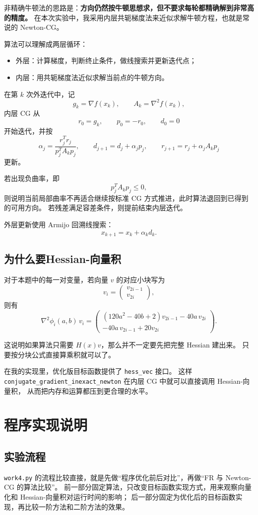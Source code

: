 \documentclass[12pt,a4paper]{ctexart}
\begin{document}
非精确牛顿法的思路是：\textbf{方向仍然按牛顿思想求，但不要求每轮都精确解到非常高的精度。}
在本次实验中，我采用内层共轭梯度法来近似求解牛顿方程，也就是常说的 Newton-CG。

算法可以理解成两层循环：
\begin{itemize}
  \item 外层：计算梯度，判断终止条件，做线搜索并更新迭代点；
  \item 内层：用共轭梯度法近似求解当前点的牛顿方向。
\end{itemize}

在第 \(k\) 次外迭代中，记
\[
g_k=\nabla f(x_k), \qquad A_k=\nabla^2 f(x_k),
\]
内层 CG 从
\[
r_0=g_k,\qquad p_0=-r_0,\qquad d_0=0
\]
开始迭代，并按
\[
\alpha_j=\frac{r_j^T r_j}{p_j^T A_k p_j}, \qquad
d_{j+1}=d_j+\alpha_j p_j, \qquad
r_{j+1}=r_j+\alpha_j A_k p_j
\]
更新。

若出现负曲率，即
\[
p_j^T A_k p_j \le 0,
\]
则说明当前局部曲率不再适合继续按标准 CG 方式推进，此时算法退回到已得到的可用方向。
若残差满足容差条件，则提前结束内层迭代。

外层更新使用 Armijo 回溯线搜索：
\[
x_{k+1}=x_k+\alpha_k d_k.
\]



\subsection{为什么要Hessian-向量积}
对于本题中的每一对变量，若向量 \(v\) 的对应小块写为
\[
v_i=
\begin{pmatrix}
v_{2i-1}\\
v_{2i}
\end{pmatrix},
\]
则有
\[
\nabla^2 \phi_i(a,b)\, v_i=
\begin{pmatrix}
(120a^2-40b+2)v_{2i-1}-40a\,v_{2i}\\
-40a\,v_{2i-1}+20v_{2i}
\end{pmatrix}.
\]

这说明如果算法只需要 \(H(x)v\)，那么并不一定要先把完整 Hessian 建出来。
只要按分块公式直接算乘积就可以了。

在我的实现里，优化版目标函数提供了 \texttt{hess\_vec} 接口。
这样 \texttt{conjugate\_gradient\_inexact\_newton} 在内层 CG 中就可以直接调用 Hessian-向量积，
从而把内存和运算都压到更合理的水平。

\section{程序实现说明}
\subsection{实验流程}
\texttt{work4.py} 的流程比较直接，就是先做“程序优化前后对比”，再做“FR 与 Newton-CG 的算法比较”。
前一部分固定算法，只改变目标函数实现方式，用来观察向量化和 Hessian-向量积对运行时间的影响；
后一部分固定为优化后的目标函数实现，再比较一阶方法和二阶方法的效果。
\end{document}
